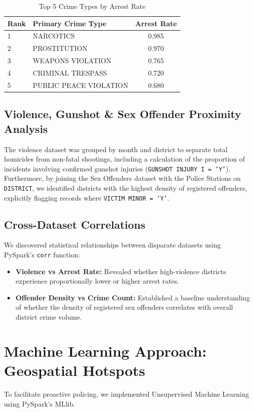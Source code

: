 \documentclass[12pt]{article}
\begin{document}
\begin{table}[h]
\centering
\begin{tabular}{@{}llc@{}}
\toprule
\textbf{Rank} & \textbf{Primary Crime Type} & \textbf{Arrest Rate} \\ \midrule
1 & NARCOTICS & 0.985 \\
2 & PROSTITUTION & 0.970 \\
3 & WEAPONS VIOLATION & 0.765 \\
4 & CRIMINAL TRESPASS & 0.720 \\
5 & PUBLIC PEACE VIOLATION & 0.680 \\ \bottomrule
\end{tabular}
\caption{Top 5 Crime Types by Arrest Rate}
\end{table}

\subsection{Violence, Gunshot \& Sex Offender Proximity Analysis}
The violence dataset was grouped by month and district to separate total homicides from non-fatal shootings, including a calculation of the proportion of incidents involving confirmed gunshot injuries (\texttt{GUNSHOT INJURY I = 'Y'}). Furthermore, by joining the Sex Offenders dataset with the Police Stations on \texttt{DISTRICT}, we identified districts with the highest density of registered offenders, explicitly flagging records where \texttt{VICTIM MINOR = 'Y'}.

\subsection{Cross-Dataset Correlations}
We discovered statistical relationships between disparate datasets using PySpark's \texttt{corr} function:
\begin{itemize}
    \item \textbf{Violence vs Arrest Rate:} Revealed whether high-violence districts experience proportionally lower or higher arrest rates.
    \item \textbf{Offender Density vs Crime Count:} Established a baseline understanding of whether the density of registered sex offenders correlates with overall district crime volume.
\end{itemize}

\newpage
\section{Machine Learning Approach: Geospatial Hotspots}
To facilitate proactive policing, we implemented Unsupervised Machine Learning using PySpark's MLlib.
\end{document}
